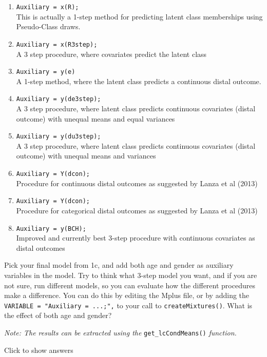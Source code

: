 \documentclass[
]{book}
\providecommand{\tightlist}{%
  \setlength{\itemsep}{0pt}\setlength{\parskip}{0pt}}
\begin{document}
\begin{enumerate}
\def\labelenumi{\arabic{enumi}.}
\tightlist
\item
  \texttt{Auxiliary\ =\ x(R);}~\\
  This is actually a 1-step method for predicting latent class memberships using Pseudo-Class draws.
\item
  \texttt{Auxiliary\ =\ x(R3step);}~\\
  A 3 step procedure, where covariates predict the latent class
\item
  \texttt{Auxiliary\ =\ y(e)}~\\
  A 1-step method, where the latent class predicts a continuous distal outcome.
\item
  \texttt{Auxiliary\ =\ y(de3step);}~\\
  A 3 step procedure, where latent class predicts continuous covariates (distal outcome) with unequal means and equal variances
\item
  \texttt{Auxiliary\ =\ y(du3step);}~\\
  A 3 step procedure, where latent class predicts continuous covariates (distal outcome) with unequal means and variances
\item
  \texttt{Auxiliary\ =\ Y(dcon);}~\\
  Procedure for continuous distal outcomes as suggested by Lanza et al (2013)
\item
  \texttt{Auxiliary\ =\ Y(dcon);}~\\
  Procedure for categorical distal outcomes as suggested by Lanza et al (2013)
\item
  \texttt{Auxiliary\ =\ y(BCH);}~\\
  Improved and currently best 3-step procedure with continuous covariates as distal outcomes
\end{enumerate}

Pick your final model from 1c, and add both age and gender as auxiliary variables in the model. Try to think what 3-step model you want, and if you are not sure, run different models, so you can evaluate how the different procedures make a difference. You can do this by editing the Mplus file, or by adding the \texttt{VARIABLE\ =\ "Auxiliary\ =\ ...;",} to your call to \texttt{createMixtures()}. What is the effect of both age and gender?

\emph{Note: The results can be extracted using the} \texttt{get\_lcCondMeans()} \emph{function.}

Click to show answers
\end{document}
